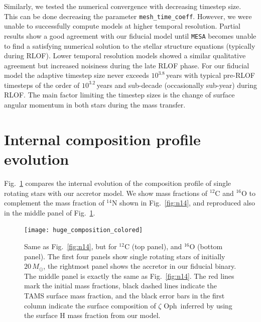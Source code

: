\documentclass[twocolumn,twocolappendix,trackchanges]{aastex63}
\DeclareRobustCommand{\Figref}[1]{Fig.~\ref{#1}}
\newcommand{\zoph}{$\zeta$ Oph}
\begin{document}
Similarly, we tested the numerical convergence with decreasing
timestep size. This can be done decreasing the parameter
\texttt{mesh\_time\_coeff}. However, we were unable to successfully
compute models at higher temporal resolution. Partial results show a
good agreement with our fiducial model until \texttt{MESA} becomes
unable to find a satisfying numerical solution to the stellar
structure equations (typically
during RLOF). Lower temporal resolution models showed a similar
qualitative agreement but increased noisiness during the late RLOF
phase. For our fiducial model the adaptive timestep size never exceeds
$10^{3.8}$\,years with typical pre-RLOF timesteps of the order of $10^{3.2}$\,years
and sub-decade (occasionally sub-year) during RLOF. The main factor limiting the timestep
sizes is the change of surface angular momentum in both stars during
the mass transfer.


\section{Internal composition profile evolution}
\label{sec:X_fig}


\Figref{fig:composition_huge} compares the internal evolution of the composition
profile of single rotating stars with our accretor model.
We show mass fractions of $^{12}\mathrm{C}$  and $^{16}\mathrm{O}$ to complement the
mass fraction of $^{14}\mathrm{N}$ shown in \Figref{fig:n14}, and
reproduced also in the middle panel of \Figref{fig:composition_huge}.


\begin{figure}[htbp]
  \centering
  \texttt{[image: huge\_composition\_colored]}
  \caption{Same as \Figref{fig:n14}, but for $^{12}\mathrm{C}$ (top
    panel), and $^{16}\mathrm{O}$ (bottom panel). The first four
    panels show single rotating stars of initially $20\,M_\odot$, the
    rightmost panel shows the accretor in our fiducial binary. The middle panel is
    exactly the same as \Figref{fig:n14}. The red lines mark the
    initial mass fractions, black dashed lines indicate the TAMS surface mass
    fraction, and the black error bars in the first column indicate
    the surface composition of \zoph\ inferred by 
    using the surface H mass fraction from our model.}
  \label{fig:composition_huge}
\end{figure}



\end{document}
